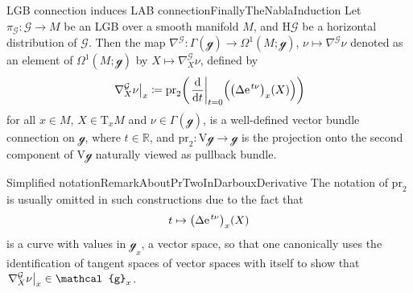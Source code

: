 \documentclass[reqno,a4paper,oneside]{amsart}
\newcommand{\e}{\ensuremath{\mathrm{e\;\!}}}
\theoremstyle{plain}
\theoremstyle{remark}
\theoremstyle{definition}
\begin{document}
\begin{propositions}{LGB connection induces LAB connection}{FinallyTheNablaInduction}
Let $\pi_{\mathcal{G}}\colon\mathcal{G} \to M$ be an LGB over a smooth manifold $M$, and $\mathrm{H}\mathcal{G}$ be a horizontal distribution of $\mathcal{G}$. Then the map $\nabla^{\mathcal{G}}\colon \Gamma(\mathcal{g}) \to \Omega^1(M; \mathcal{g})$, $\nu \mapsto \nabla^{\mathcal{G}}\nu$ denoted as an element of $\Omega^1(M; \mathcal{g})$ by $X \mapsto \nabla^{\mathcal{G}}_X \nu$, defined by
\begin{equation*}
\mleft.\nabla^{\mathcal{G}}_X \nu\mright|_x
\coloneqq
\mathrm{pr}_2 \mleft(
\mleft.\frac{\mathrm{d}}{\mathrm{d}t}\mright|_{t=0} \Bigl( \mleft(\Delta \e^{t \nu}\mright)_x (X) \Bigr)
\mright)
\end{equation*}
for all $x \in M$, $X \in \mathrm{T}_xM$ and $\nu \in \Gamma(\mathcal{g})$, is a well-defined vector bundle connection on $\mathcal{g}$, where $t \in \mathbb{R}$, and $\mathrm{pr}_2: \mathrm{V}\mathcal{g} \to \mathcal{g}$ is the projection onto the second component of $\mathrm{V}\mathcal{g}$ naturally viewed as pullback bundle.
\end{propositions}

\begin{remarks}{Simplified notation}{RemarkAboutPrTwoInDarbouxDerivative}
The notation of $\mathrm{pr}_2$ is usually omitted in such constructions due to the fact that 
\begin{equation*}
t \mapsto \mleft(\Delta \e^{t \nu}\mright)_x (X)
\end{equation*}
is a curve with values in $\mathcal{g}_x$, a vector space, so that one canonically uses the identification of tangent spaces of vector spaces with itself to show that $\mleft.\nabla^{\mathcal{G}}_X \nu\mright|_x \in \mathcal{g}_x$.
\end{remarks}

\end{document}
